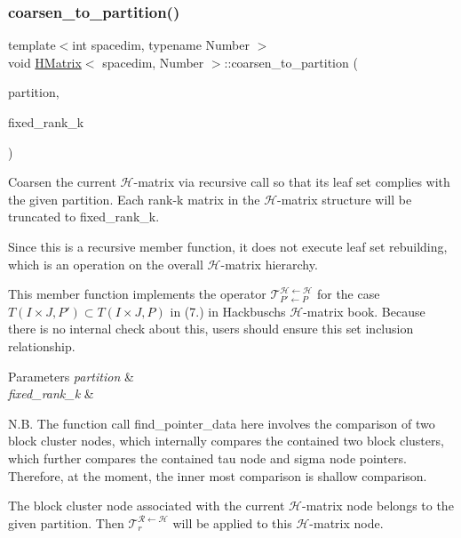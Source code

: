 \subsubsection{\texorpdfstring{coarsen\+\_\+to\+\_\+partition()}{coarsen\_to\_partition()}}
{\footnotesize\ttfamily template$<$int spacedim, typename Number $>$ \\
void \hyperlink{classHMatrix}{H\+Matrix}$<$ spacedim, Number $>$\+::coarsen\+\_\+to\+\_\+partition (\begin{DoxyParamCaption}\item[{const std\+::vector$<$ typename \hyperlink{classBlockClusterTree}{Block\+Cluster\+Tree}$<$ spacedim, Number $>$\+::node\+\_\+pointer\+\_\+type $>$ \&}]{partition,  }\item[{const unsigned int}]{fixed\+\_\+rank\+\_\+k }\end{DoxyParamCaption})}

Coarsen the current $\mathcal{H}$-\/matrix via recursive call so that its leaf set complies with the given partition. Each rank-\/k matrix in the $\mathcal{H}$-\/matrix structure will be truncated to {\ttfamily fixed\+\_\+rank\+\_\+k}.

Since this is a recursive member function, it does not execute leaf set rebuilding, which is an operation on the overall $\mathcal{H}$-\/matrix hierarchy.

This member function implements the operator $\mathcal{T}_{P' \leftarrow P}^{\mathcal{H} \leftarrow \mathcal{H}}$ for the case $T(I \times J, P') \subset T(I \times J, P)$ in (7.) in Hackbusch\textquotesingle{}s $\mathcal{H}$-\/matrix book. Because there is no internal check about this, users should ensure this set inclusion relationship.


\begin{DoxyParams}{Parameters}
{\em partition} & \\
\hline
{\em fixed\+\_\+rank\+\_\+k} & \\
\hline
\end{DoxyParams}
N.\+B. The function call {\ttfamily find\+\_\+pointer\+\_\+data} here involves the comparison of two block cluster nodes, which internally compares the contained two block clusters, which further compares the contained tau node and sigma node pointers. Therefore, at the moment, the inner most comparison is shallow comparison.

The block cluster node associated with the current $\mathcal{H}$-\/matrix node belongs to the given {\ttfamily partition}. Then $\mathcal{T}_r^{\mathcal{R} \leftarrow \mathcal{H}}$ will be applied to this $\mathcal{H}$-\/matrix node.

